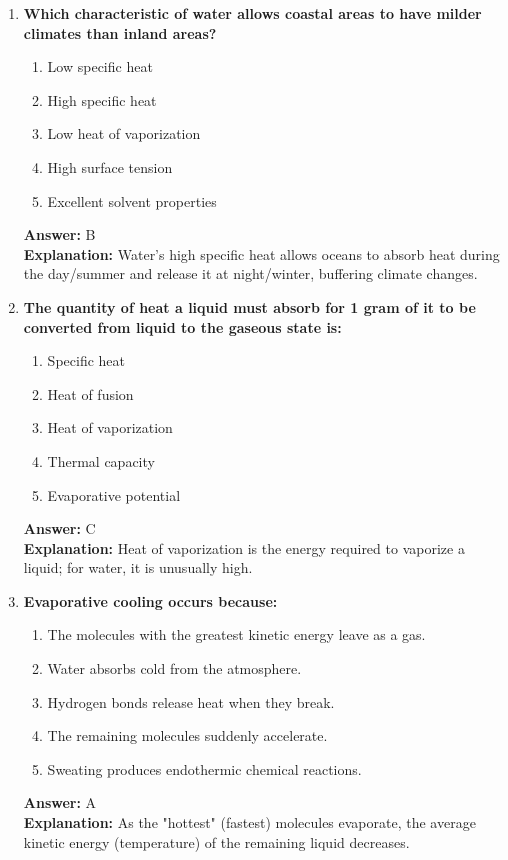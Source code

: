 \documentclass[11pt, a4paper]{article}
\begin{document}
\begin{enumerate}
\item \textbf{Which characteristic of water allows coastal areas to have milder climates than inland areas?}
\begin{enumerate}[label=\Alph*.]
    \item Low specific heat
    \item High specific heat
    \item Low heat of vaporization
    \item High surface tension
    \item Excellent solvent properties
\end{enumerate}
\textbf{Answer:} B \\
\textbf{Explanation:} Water's high specific heat allows oceans to absorb heat during the day/summer and release it at night/winter, buffering climate changes.

\item \textbf{The quantity of heat a liquid must absorb for 1 gram of it to be converted from liquid to the gaseous state is:}
\begin{enumerate}[label=\Alph*.]
    \item Specific heat
    \item Heat of fusion
    \item Heat of vaporization
    \item Thermal capacity
    \item Evaporative potential
\end{enumerate}
\textbf{Answer:} C \\
\textbf{Explanation:} Heat of vaporization is the energy required to vaporize a liquid; for water, it is unusually high.

\item \textbf{Evaporative cooling occurs because:}
\begin{enumerate}[label=\Alph*.]
    \item The molecules with the greatest kinetic energy leave as a gas.
    \item Water absorbs cold from the atmosphere.
    \item Hydrogen bonds release heat when they break.
    \item The remaining molecules suddenly accelerate.
    \item Sweating produces endothermic chemical reactions.
\end{enumerate}
\textbf{Answer:} A \\
\textbf{Explanation:} As the "hottest" (fastest) molecules evaporate, the average kinetic energy (temperature) of the remaining liquid decreases.


\end{enumerate}
\end{document}
